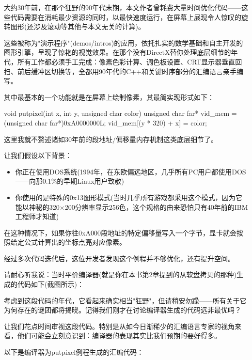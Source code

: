 
大约30年前，在那个狂野的90年代末期，本文作者曾耗费大量时间优化代码——这些代码需要在消耗最少资源的同时，以最快速度运行，在屏幕上展现令人惊叹的旋转图形(还涉及滚动等其他与本文无关的计算)。

这些被称为"演示程序"(demos/intros)的应用，依托扎实的数学基础和自主开发的图形引擎，呈现了惊艳的视觉效果。在那个没有DirectX替你处理底层细节的年代，所有工作都必须手工完成：像素色彩计算、调色板设置、CRT显示器垂直回扫、前后缓冲区切换等，全都用90年代的C++和关键时序部分的汇编语言亲手编写。

其中最基本的一个功能就是在屏幕上绘制像素，其最简实现形式如下：

\begin{cpp}
void putpixel(int x, int y, unsigned char color) {
  unsigned char far* vid_mem = (unsigned char far*)0xA0000000L;
  vid_mem[(y * 320) + x] = color;
}
\end{cpp}

这里我就不赘述诸如30年前的段地址/偏移量内存机制这类底层细节了。

让我们假设以下背景：

\begin{itemize}
\item 
你正在使用DOS系统(1994年，在东欧偏远地区，几乎所有PC用户都使用DOS——向那0.1\%的早期Linux用户致敬)

\item 
你使用的是特殊的0x13图形模式(当时几乎所有游戏都采用这个模式，因为它能以神秘的320×200分辨率显示256色，这个规格的由来恐怕只有40年前的IBM工程师才知道)
\end{itemize}

在这种情况下，如果你往0xA000段地址的特定偏移量写入一个字节，显卡就会按照给定公式计算出的坐标点亮对应像素。

经过多次代码迭代后，这位开发者发现这个例程并不够优化，还有提升空间。

请耐心听我说：当时平价编译器(就是你在本书第2章提到的从软盘拷贝的那种)生成的代码如下(截图所示)：


考虑到这段代码的年代，它看起来确实相当"狂野"，但请稍安勿躁——所有关于它为何存在的谜团都将揭晓。记得我们刚才在讨论编译器生成的代码远非最优吗？

让我们花点时间审视这段代码。特别是从如今日渐稀少的汇编语言专家的视角来看，他们可能会立刻意识到：编译器的表现其实比我们预期的要好得多。

以下是编译器为putpixel例程生成的汇编代码：

